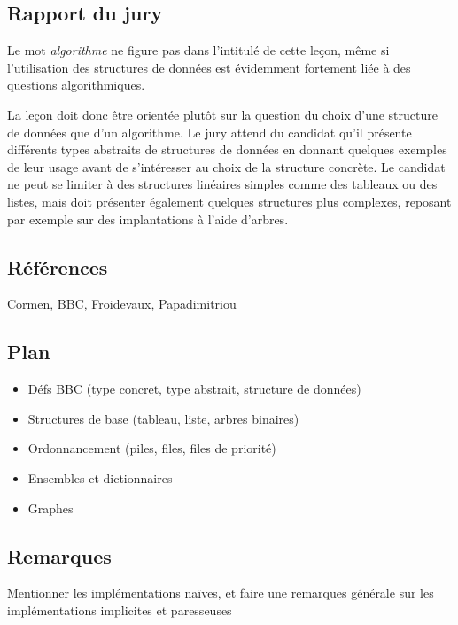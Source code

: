 \documentclass[../../Agregation.tex]{subfiles}
\begin{document}

\subsection{Rapport du jury}

\begin{aquote}{}
Le mot \emph{algorithme} ne figure pas dans l'intitulé de cette leçon, même si l'utilisation des structures de données est évidemment fortement liée à des questions algorithmiques.

La leçon doit donc être orientée plutôt sur la question du choix d'une structure de données que d'un algorithme. Le jury attend du candidat qu'il présente différents types abstraits de structures de données en donnant quelques exemples de leur usage avant de s'intéresser au choix de la structure concrète. Le candidat ne peut se limiter à des structures linéaires simples comme des tableaux ou des listes, mais doit présenter également quelques structures plus complexes, reposant par exemple sur des implantations à l'aide d'arbres.
\end{aquote}

\dvts

\subsection{Références}

Cormen, BBC, Froidevaux, Papadimitriou

\subsection{Plan}

\begin{itemize}
	\item Défs BBC (type concret, type abstrait, structure de données)
	\item Structures de base (tableau, liste, arbres binaires)
	\item Ordonnancement (piles, files, files de priorité)
	\item Ensembles et dictionnaires
	\item Graphes
\end{itemize}

\subsection{Remarques}

Mentionner les implémentations naïves, et faire une remarques générale sur les implémentations implicites et paresseuses
\end{document}
